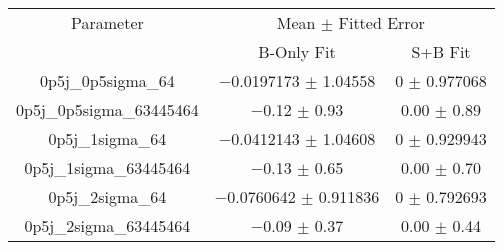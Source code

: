 \begin{scriptsize}
\begin{table}
\centering
\begin{tabular}{ccc}
\toprule
Parameter & \multicolumn{2}{c}{{Mean $\pm$ Fitted Error}}\\
 & {B-Only Fit} & {S+B Fit}\\
\midrule
0p5j\_0p5sigma\_64 & \num{-0.0197173} $\pm$ \num{1.04558} & \num{0} $\pm$ \num{0.977068}\\
0p5j\_0p5sigma\_63445464 & \num{-0.12} $\pm$ \num{0.93} & \num{+0.00} $\pm$ \num{0.89}\\
0p5j\_1sigma\_64 & \num{-0.0412143} $\pm$ \num{1.04608} & \num{0} $\pm$ \num{0.929943}\\
0p5j\_1sigma\_63445464 & \num{-0.13} $\pm$ \num{0.65} & \num{+0.00} $\pm$ \num{0.70}\\
0p5j\_2sigma\_64 & \num{-0.0760642} $\pm$ \num{0.911836} & \num{0} $\pm$ \num{0.792693}\\
0p5j\_2sigma\_63445464 & \num{-0.09} $\pm$ \num{0.37} & \num{+0.00} $\pm$ \num{0.44}\\
\bottomrule
\end{tabular}
\end{table}
\end{scriptsize}
